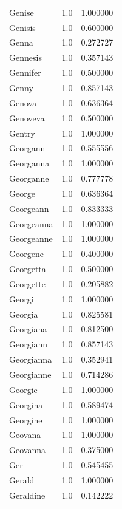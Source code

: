 \documentclass[
  letterpaper,
  DIV=11,
  numbers=noendperiod]{scrreprt}
\begin{document}
\begin{tabular}{lrr}
Genise          &   1.0 &   1.000000 \\
Genisis         &   1.0 &   0.600000 \\
Genna           &   1.0 &   0.272727 \\
Gennesis        &   1.0 &   0.357143 \\
Gennifer        &   1.0 &   0.500000 \\
Genny           &   1.0 &   0.857143 \\
Genova          &   1.0 &   0.636364 \\
Genoveva        &   1.0 &   0.500000 \\
Gentry          &   1.0 &   1.000000 \\
Georgann        &   1.0 &   0.555556 \\
Georganna       &   1.0 &   1.000000 \\
Georganne       &   1.0 &   0.777778 \\
George          &   1.0 &   0.636364 \\
Georgeann       &   1.0 &   0.833333 \\
Georgeanna      &   1.0 &   1.000000 \\
Georgeanne      &   1.0 &   1.000000 \\
Georgene        &   1.0 &   0.400000 \\
Georgetta       &   1.0 &   0.500000 \\
Georgette       &   1.0 &   0.205882 \\
Georgi          &   1.0 &   1.000000 \\
Georgia         &   1.0 &   0.825581 \\
Georgiana       &   1.0 &   0.812500 \\
Georgiann       &   1.0 &   0.857143 \\
Georgianna      &   1.0 &   0.352941 \\
Georgianne      &   1.0 &   0.714286 \\
Georgie         &   1.0 &   1.000000 \\
Georgina        &   1.0 &   0.589474 \\
Georgine        &   1.0 &   1.000000 \\
Geovana         &   1.0 &   1.000000 \\
Geovanna        &   1.0 &   0.375000 \\
Ger             &   1.0 &   0.545455 \\
Gerald          &   1.0 &   1.000000 \\
Geraldine       &   1.0 &   0.142222 \\

\end{tabular}
\end{document}

